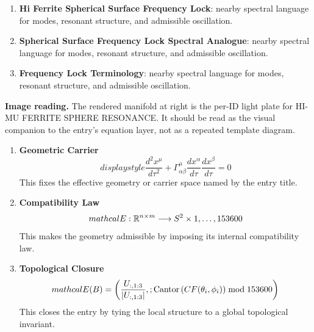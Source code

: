 \begin{enumerate}[leftmargin=1.6em,itemsep=6pt,topsep=4pt]
\item \textbf{Hi Ferrite Spherical Surface Frequency Lock}: nearby spectral language for modes, resonant structure, and admissible oscillation.
\item \textbf{Spherical Surface Frequency Lock Spectral Analogue}: nearby spectral language for modes, resonant structure, and admissible oscillation.
\item \textbf{Frequency Lock Terminology}: nearby spectral language for modes, resonant structure, and admissible oscillation.
\end{enumerate}

\begin{samepage}
\noindent\begin{minipage}[t]{0.45\linewidth}
\vspace{0pt}
\raggedright
\scriptsize\textbf{Image reading.} The rendered manifold at right is the per-ID light plate for HI-MU FERRITE SPHERE RESONANCE. It should be read as the visual companion to the entry's equation layer, not as a repeated template diagram.\par
\end{minipage}\hfill
\begin{minipage}[t]{0.53\linewidth}
\vspace*{-0.10in}
\raggedright
{}
\end{minipage}
\end{samepage}

\clearpage


\begin{enumerate}[leftmargin=1.6em,itemsep=9pt,topsep=6pt]
\item \textbf{Geometric Carrier}
\[
displaystyle \frac{d^2 x^\mu}{d\tau^2} + \Gamma^\mu_{\alpha\beta} \frac{d x^\alpha}{d\tau} \frac{d x^\beta}{d\tau} = 0
\]
This fixes the effective geometry or carrier space named by the entry title.

\item \textbf{Compatibility Law}
\[
mathcal{E}: \mathbb{R}^{n\times m} \longrightarrow S^2 \times \\{1,\dots,153600\\}
\]
This makes the geometry admissible by imposing its internal compatibility law.

\item \textbf{Topological Closure}
\[
mathcal{E}(B) = \left( \frac{U_{:,1:3}}{\\|U_{:,1:3}\\|},\\; \mathrm{Cantor}\left( CF(\theta_i,\phi_i) \right) \bmod 153600 \right)
\]
This closes the entry by tying the local structure to a global topological invariant.
\end{enumerate}

